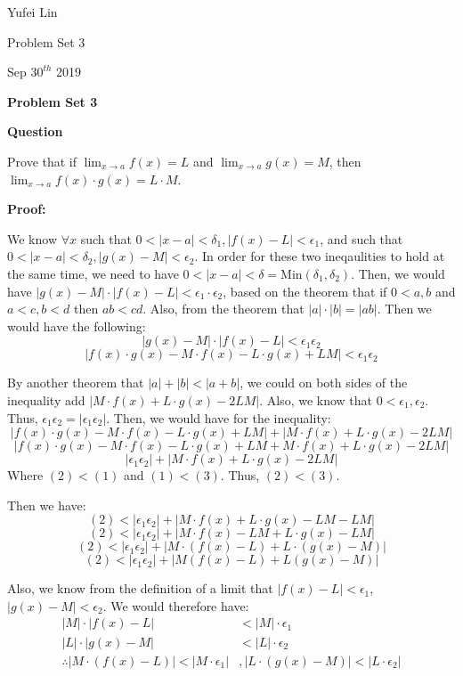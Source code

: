 \documentclass[a4paper,12pt]{report}
\begin{document}
\noindent
Yufei Lin

\noindent
Problem Set 3

\noindent
Sep \(30^{th}\) 2019

\begin{center}
\textbf{Problem Set 3}
\end{center}

\noindent
\textbf{Question}

\noindent
Prove that if $\lim_{x\to a} f(x)=L$ and $\lim_{x\to a} g(x)=M$, then $\lim_{x\to a} f(x)\cdot{g(x)}=L\cdot{M}$.

\noindent
\textbf{Proof: }

\noindent
We know $\forall x $ such that $0<|x-a|<\delta_1, |f(x)-L|< \epsilon_1$, and such that $0<|x-a|<\delta_2, |g(x)-M|< \epsilon_2$. In order for these two ineqaulities to hold at the same time, we need to have $0<|x-a|<\delta=\text{Min}(\delta_1,\delta_2)$. Then, we would have $|g(x)-M|\cdot{|f(x)-L|}< \epsilon_1\cdot{\epsilon_2}$, based on the theorem that if $0<a,b$ and $a<c,b<d$ then $ab<cd$. Also, from the theorem that $|a|\cdot{|b|}=|ab|$. Then we would have the following:
\[|g(x)-M|\cdot{|f(x)-L|}< \epsilon_1\epsilon_2\]
\[|f(x)\cdot{g(x)}-M\cdot{f(x)}-L\cdot{g(x)}+LM|< \epsilon_1\epsilon_2\]

\noindent
By another theorem that $|a|+|b|<|a+b|$, we could on both sides of the inequality add $|M\cdot{f(x)}+L\cdot{g(x)}-2LM|$. Also, we know that $0<\epsilon_1, \epsilon_2$. Thus, $\epsilon_1\epsilon_2=|\epsilon_1\epsilon_2|$. Then, we would have for the inequality: 
\begin{equation}
|f(x)\cdot{g(x)}-M\cdot{f(x)}-L\cdot{g(x)}+LM|+|M\cdot{f(x)}+L\cdot{g(x)}-2LM|
\end{equation}
\begin{equation}
|f(x)\cdot{g(x)}-M\cdot{f(x)}-L\cdot{g(x)}+LM+M\cdot{f(x)}+L\cdot{g(x)}-2LM|
\end{equation}
\begin{equation}
|\epsilon_1\epsilon_2|+|M\cdot{f(x)}+L\cdot{g(x)}-2LM|
\end{equation}
Where $(2)<(1)$ and $(1)<(3)$. Thus, $(2)<(3)$.

\noindent
Then we have: 
\[(2)<|\epsilon_1\epsilon_2|+|M\cdot{f(x)}+L\cdot{g(x)}-LM-LM|\]
\[(2)<|\epsilon_1\epsilon_2|+|M\cdot{f(x)}-LM+L\cdot{g(x)}-LM|\]
\[(2)<|\epsilon_1\epsilon_2|+|M\cdot{(f(x)-L)}+L\cdot{(g(x)-M)}|\]
\[(2)<|\epsilon_1\epsilon_2|+|M(f(x)-L)+L(g(x)-M)|\]

\noindent
Also, we know from the definition of a limit that $|f(x)-L|<\epsilon_1$, $|g(x)-M|<\epsilon_2$. We would therefore have:
\begin{align*}
|M|\cdot{|f(x)-L|}&<|M|\cdot{\epsilon_1}\\
|L|\cdot{|g(x)-M|}&<|L|\cdot{\epsilon_2}\\
\therefore |M\cdot{(f(x)-L)}|<|M\cdot{\epsilon_1}|&, |L\cdot{(g(x)-M)}|<|L\cdot{\epsilon_2}|
\end{align*}
\end{document}
